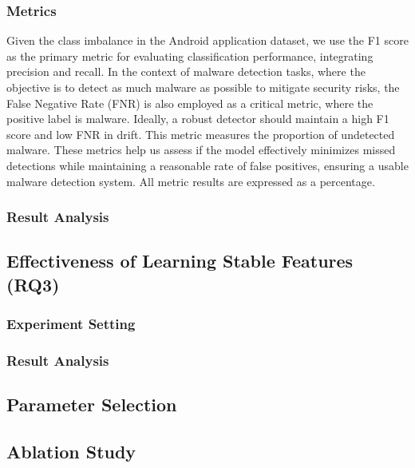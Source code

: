 \subsubsection{Metrics}
Given the class imbalance in the Android application dataset, we use the F1 score as the primary metric for evaluating classification performance, integrating precision and recall. In the context of malware detection tasks, where the objective is to detect as much malware as possible to mitigate security risks, the False Negative Rate (FNR) is also employed as a critical metric, where the positive label is malware. Ideally, a robust detector should maintain a high F1 score and low FNR in drift. This metric measures the proportion of undetected malware. These metrics help us assess if the model effectively minimizes missed detections while maintaining a reasonable rate of false positives, ensuring a usable malware detection system. All metric results are expressed as a percentage.

\subsubsection{Result Analysis}

\subsection{Effectiveness of Learning Stable Features (RQ3)}
\subsubsection{Experiment Setting}

\subsubsection{Result Analysis}

\subsection{Parameter Selection}

\subsection{Ablation Study}

